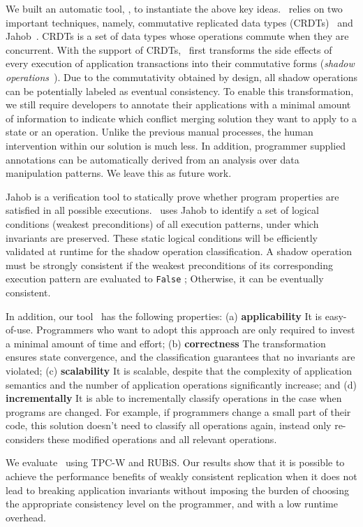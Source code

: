 We built an automatic tool, \tool, to instantiate the above key ideas. \tool\ relies on
two important techniques, namely, commutative replicated data types (CRDTs)~\cite{Preguica2009CRDT}
and Jahob~\cite{Kuncak2007Jahob}. CRDTs is a set of data types whose operations commute
when they are concurrent. With the support of CRDTs, \tool\ first transforms the side effects of every execution of application
transactions into their commutative forms (\emph{shadow operations}~\cite{Li2012RedBlue}). 
Due to the commutativity obtained by design, all shadow operations can be potentially 
labeled as eventual consistency. To enable this transformation, we still require 
developers to annotate their applications with a minimal amount of information to indicate which 
conflict merging solution they want to apply to a state or an operation. Unlike the previous
manual processes, the human intervention within our solution is much less. In addition, programmer 
supplied annotations can be automatically derived from an analysis over data manipulation patterns. 
We leave this as future work. 

Jahob is a verification tool to statically prove whether program properties are
satisfied in all possible executions. \tool\ uses Jahob to identify a set of logical 
conditions (weakest preconditions) of all execution patterns, under which invariants 
are preserved. These static logical conditions will be efficiently validated at runtime for
the shadow operation classification. A shadow operation must be strongly consistent 
if the weakest preconditions of its corresponding execution pattern are evaluated to \texttt{False} ;
Otherwise, it can be eventually consistent.

In addition, our tool \tool\ has the following properties: (a) \textbf{applicability} 
It is easy-of-use. Programmers who want to adopt this approach are only required to invest a minimal 
amount of time and effort; (b) \textbf{correctness} The transformation ensures state convergence, 
and the classification guarantees that no invariants are violated; 
(c) \textbf{scalability} It is scalable, despite that the complexity of application semantics 
and the number of application operations significantly increase; and (d) \textbf{incrementally} 
It is able to incrementally classify operations in the case when programs are changed. 
For example, if programmers change a small part of their code, this solution doesn't need to classify all 
operations again, instead only re-considers these modified operations and all relevant operations.

\fi
We evaluate \tool\ using TPC-W and RUBiS. Our results show that it
is possible to achieve the performance benefits of weakly consistent replication
when it does not lead to breaking
application invariants without imposing the burden of choosing
the appropriate consistency level on the programmer, and with
a low runtime overhead.

